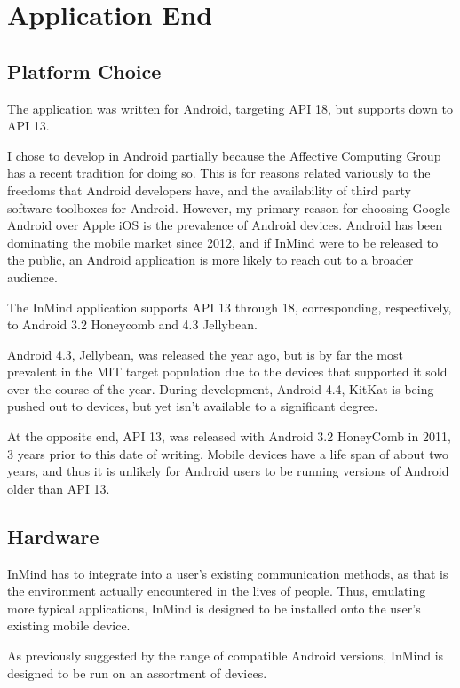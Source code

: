   \section{Application End}

    \subsection{Platform Choice}
    The application was written for Android, targeting API 18,
    but supports down to API 13.

    I chose to develop in Android partially because the Affective Computing Group
    has a recent tradition for doing so.
    This is for reasons related variously to the freedoms that Android developers have,
    and the availability of third party software toolboxes for Android.
    However, my primary reason for choosing Google Android over Apple iOS is
    the prevalence of Android devices.
    Android has been dominating the mobile market since 2012,
    and if InMind were to be released to the public,
    an Android application is more likely to reach out to a broader audience.

    The InMind application supports API 13 through 18, 
    corresponding, respectively, to Android 3.2 Honeycomb and 4.3 Jellybean.

    Android 4.3, Jellybean, was released the year ago, but is by far
    the most prevalent in the MIT target population due to the devices
    that supported it sold over the course of the year.
    During development, Android 4.4, KitKat is being pushed out to devices,
    but yet isn't available to a significant degree.

    At the opposite end, API 13, was released with Android 3.2 HoneyComb
    in 2011, 3 years prior to this date of writing.
    Mobile devices have a life span of about two years,
    and thus it is unlikely for Android users to be
    running versions of Android older than API 13.

    \subsection{Hardware}
    InMind has to integrate into a user's existing communication methods,
    as that is the environment actually encountered in the lives of people.
    Thus, emulating more typical applications,
    InMind is designed to be installed onto the user's existing mobile device.

    As previously suggested by the range of compatible Android versions,
    InMind is designed to be run on an assortment of devices.
    
